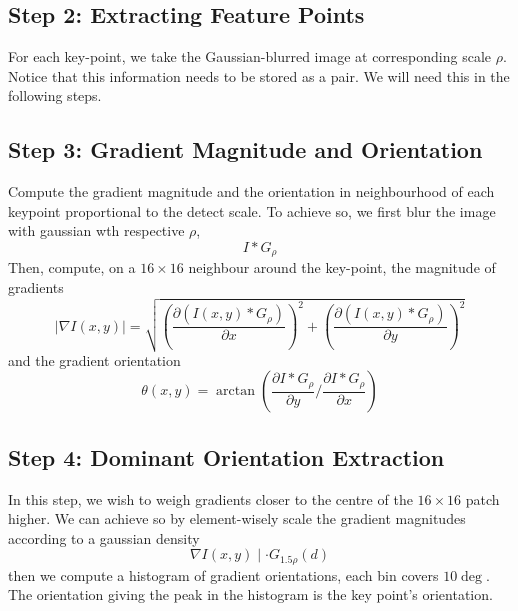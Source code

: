 \documentclass[11pt]{article}
\begin{document}
\subsection{Step 2: Extracting Feature Points}
For each key-point, we take the Gaussian-blurred image at corresponding scale $\rho$. Notice that this information needs to be stored as a pair. We will need this in the following steps. 

\subsection{Step 3: Gradient Magnitude and Orientation}
Compute the gradient magnitude and the orientation in neighbourhood of each keypoint proportional to the detect scale. To achieve so, we first blur the image with gaussian wth respective $\rho$, 
\begin{equation}
	I \ast G_\rho
\end{equation}
Then, compute, on a $16 \times 16$ neighbour around the key-point, the magnitude of gradients 
\begin{equation}
	|\nabla I(x, y)|=\sqrt{\left(\frac{\partial\left(I(x, y) * G_{\rho}\right)}{\partial x}\right)^{2}+\left(\frac{\partial\left(I(x, y) * G_{\rho}\right)}{\partial y}\right)^{2}}
\end{equation}
and the gradient orientation
\begin{equation}
	\theta(x, y)=\arctan \left(\frac{\partial I * G_{\rho}}{\partial y} / \frac{\partial I * G_{\rho}}{\partial x}\right)
\end{equation}

\subsection{Step 4: Dominant Orientation Extraction}
In this step, we wish to weigh gradients closer to the centre of the $16 \times 16$ patch higher. We can achieve so by element-wisely scale the gradient magnitudes according to a gaussian density
\begin{equation}
	\nabla I(x, y) \mid \cdot G_{1.5 \rho}(d)
\end{equation}
then we compute a histogram of gradient orientations, each bin covers $10\deg$. The orientation giving the peak in the histogram is the key point's orientation. 
\end{document}
